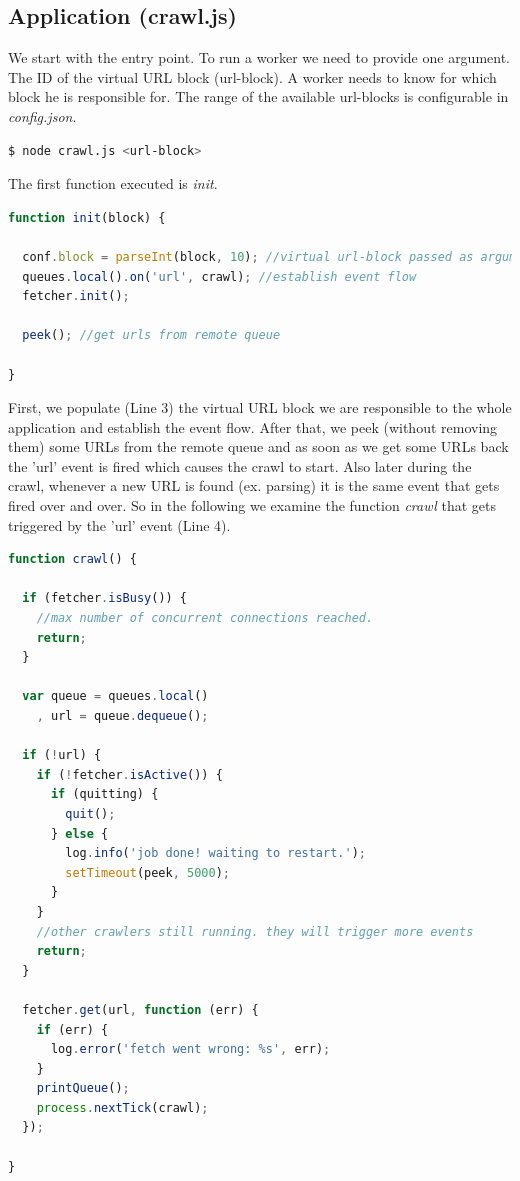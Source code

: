 \subsection{Application (crawl.js)}
We start with the entry point. To run a worker we need to provide one argument. The ID of the virtual URL block (url-block). A worker needs to know for which block he is responsible for. The range of the available url-blocks is configurable in \emph{config.json}.

\begin{lstlisting}[language=sh]
$ node crawl.js <url-block>
\end{lstlisting}

The first function executed is \emph{init}.

\begin{lstlisting}[language=JavaScript]
function init(block) {

  conf.block = parseInt(block, 10); //virtual url-block passed as argument on startup
  queues.local().on('url', crawl); //establish event flow
  fetcher.init();

  peek(); //get urls from remote queue

}
\end{lstlisting}

First, we populate (Line 3) the virtual URL block we are responsible to the whole application and establish the event flow. After that, we peek (without removing them) some URLs from the remote queue and as soon as we get some URLs back the 'url' event is fired which causes the crawl to start. Also later during the crawl, whenever a new URL is found (ex. parsing) it is the same event that gets fired over and over. So in the following we examine the function \emph{crawl} that gets triggered by the 'url' event (Line 4).

\begin{lstlisting}[language=JavaScript]
function crawl() {

  if (fetcher.isBusy()) {
    //max number of concurrent connections reached.
    return;
  }

  var queue = queues.local()
    , url = queue.dequeue();

  if (!url) {
    if (!fetcher.isActive()) {
      if (quitting) {
        quit();
      } else {
        log.info('job done! waiting to restart.');
        setTimeout(peek, 5000);
      }
    }
    //other crawlers still running. they will trigger more events
    return;
  }

  fetcher.get(url, function (err) {
    if (err) {
      log.error('fetch went wrong: %s', err);
    }
    printQueue();
    process.nextTick(crawl);
  });

}
\end{lstlisting}


